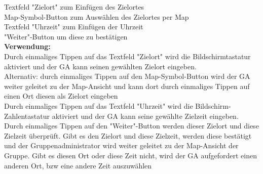 Textfeld "Zielort" zum Einfügen des Zielortes\\
Map-Symbol-Button zum Auswählen des Zielortes per Map\\
Textfeld "Uhrzeit" zum Einfügen der Uhrzeit\\
"Weiter"-Button um diese zu bestätigen\\
\textbf{Verwendung:}\\
Durch einmaliges Tippen auf das Textfeld "Zielort" wird die Bildschirmtastatur aktiviert und der GA kann seinen gewählten Zielort eingeben.\\
Alternativ: durch einmaliges Tippen auf den Map-Symbol-Button wird der GA weiter geleitet zu der Map-Ansicht und kann dort durch einmaliges Tippen auf einen Ort diesen als Zielort eingeben\\
Durch einmaliges Tippen auf das Textfeld "Uhrzeit" wird die Bildschirm-Zahlentastatur aktiviert und der GA kann seine gewählte Zielzeit eingeben.\\
Durch einmaliges Tippen auf den "Weiter"-Button werden dieser Zielort und diese Zielzeit überprüft. Gibt es den Zielort und diese Zielzeit, werden diese bestätigt und der Gruppenadministrator wird weiter geleitet zu der Map-Ansicht der Gruppe. Gibt es diesen Ort oder diese Zeit nicht, wird der GA aufgefordert einen anderen Ort, bzw eine andere Zeit auszuwählen\\

